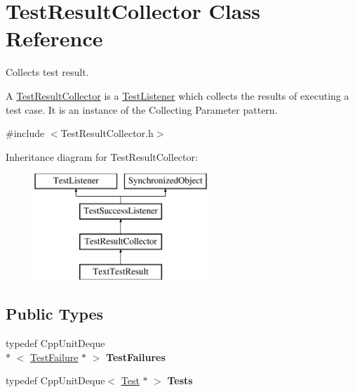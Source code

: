 \hypertarget{class_test_result_collector}{\section{Test\-Result\-Collector Class Reference}
\label{class_test_result_collector}
}


Collects test result.

A \hyperlink{class_test_result_collector}{Test\-Result\-Collector} is a \hyperlink{class_test_listener}{Test\-Listener} which collects the results of executing a test case. It is an instance of the Collecting Parameter pattern.  




{\ttfamily \#include $<$Test\-Result\-Collector.\-h$>$}

Inheritance diagram for Test\-Result\-Collector\-:\begin{figure}[H]
\begin{center}
\leavevmode
\includegraphics[height=4.000000cm]{class_test_result_collector}
\end{center}
\end{figure}
\subsection*{Public Types}
\begin{DoxyCompactItemize}
\item 
\hypertarget{class_test_result_collector_a8ae051e883095aee10d9f777664fe8af}{typedef Cpp\-Unit\-Deque\\*
$<$ \hyperlink{class_test_failure}{Test\-Failure} $\ast$ $>$ {\bfseries Test\-Failures}}\label{class_test_result_collector_a8ae051e883095aee10d9f777664fe8af}

\item 
\hypertarget{class_test_result_collector_a6ab73f8a52311857afa98a1ef049e30a}{typedef Cpp\-Unit\-Deque$<$ \hyperlink{class_test}{Test} $\ast$ $>$ {\bfseries Tests}}\label{class_test_result_collector_a6ab73f8a52311857afa98a1ef049e30a}

\end{DoxyCompactItemize}
